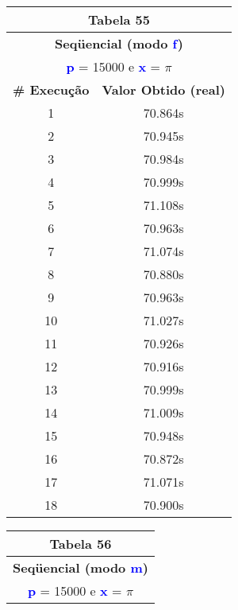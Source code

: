 \documentclass[11pt]{article}
\begin{document}
\begin{table}[!h]
	\begin{center}
		\begin{minipage}{0.48\textwidth}
			\begin{tabular}{| c | c |}
			\hline
			\multicolumn{2}{|c|}{\textbf{Tabela 55}} \\ \hline
			\multicolumn{2}{|c|}{\textbf{Seqüencial (modo \textbf{\textcolor{blue}{f}})}} \\
			\multicolumn{2}{|c|}{\textbf{\textcolor{blue}{p}} = 15000 e \textbf{\textcolor{blue}{x}} = $\pi$} \\ [0.2ex]
			\hline
				\textbf{\# Execução} &  \textbf{Valor Obtido (real)} \\ \hline
				1 & 70.864s \\ \hline
				2 & 70.945s \\ \hline
				3 & 70.984s \\ \hline
				4 & 70.999s \\ \hline
				5 & 71.108s \\ \hline
				6 & 70.963s \\ \hline
				7 & 71.074s \\ \hline
				8 & 70.880s \\ \hline
				9 & 70.963s \\ \hline
				10 & 71.027s \\ \hline
				11 & 70.926s \\ \hline
				12 & 70.916s \\ \hline
				13 & 70.999s \\ \hline
				14 & 71.009s \\ \hline
				15 & 70.948s \\ \hline
				16 & 70.872s \\ \hline
				17 & 71.071s \\ \hline
				18 & 70.900s \\ \hline
			\end{tabular}
		\end{minipage}
		\begin{minipage}{0.48\textwidth}
			\begin{tabular}{| c | c |}
			\hline
			\multicolumn{2}{|c|}{\textbf{Tabela 56}} \\ \hline
			\multicolumn{2}{|c|}{\textbf{Seqüencial (modo \textbf{\textcolor{blue}{m}})}} \\
			\multicolumn{2}{|c|}{\textbf{\textcolor{blue}{p}} = 15000 e \textbf{\textcolor{blue}{x}} = $\pi$} \\ [0.2ex]
			\hline

\end{tabular}
\end{minipage}
\end{center}
\end{table}
\end{document}
